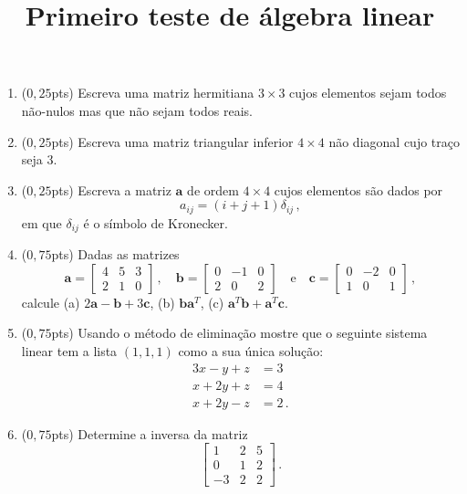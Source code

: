 \documentclass[12pt,a4paper]{article}
\title{Primeiro teste de álgebra linear}
\date{}
\newcommand{\mb}{\mathbf}
\begin{document}
\maketitle
\begin{enumerate}
  \item ($0{,}25$pts) Escreva uma matriz hermitiana $3\times 3$ cujos elementos sejam todos não-nulos mas que não sejam todos reais.
  \item ($0{,}25$pts) Escreva uma matriz triangular inferior $4\times 4$ não diagonal cujo traço seja $3$.
  \item ($0,25$pts) Escreva a matriz $\mb a$ de ordem $4\times 4$ cujos elementos são dados por
  $$a_{ij}=(i+j+1)\delta_{ij}\,,$$
  em que $\delta_{ij}$ é o símbolo de Kronecker.
  \item ($0{,}75$pts) Dadas as matrizes
  $$\mb a=\begin{bmatrix}
    4&5&3\\
    2&1&0
  \end{bmatrix}\,,\quad \mb b=\begin{bmatrix}
    0&-1&0\\
    2&0&2
  \end{bmatrix}\quad\text{e}\quad \mb c=\begin{bmatrix}
      0&-2&0\\
      1&0&1
  \end{bmatrix}\,,$$
  calcule (a) $2\mb a-\mb b+3\mb c$, (b) $\mb b\mb a^T$, (c) $\mb a^T\mb b+\mb a^T\mb c$.%
  \item ($0{,}75$pts) Usando o método de eliminação mostre que o seguinte sistema linear tem a lista $(1,1,1)$ como a sua única solução:
  \begin{equation*}
    \begin{split}
      3x-y+z&=3\\
      x+2y+z&=4\\
      x+2y-z&=2\,.
    \end{split}
  \end{equation*}
  \item ($0{,}75$pts) Determine a inversa da matriz
  $$\begin{bmatrix}
      1&2&5\\
      0&1&2\\
      -3&2&2
  \end{bmatrix}\,.$$
\end{enumerate}
\end{document}
